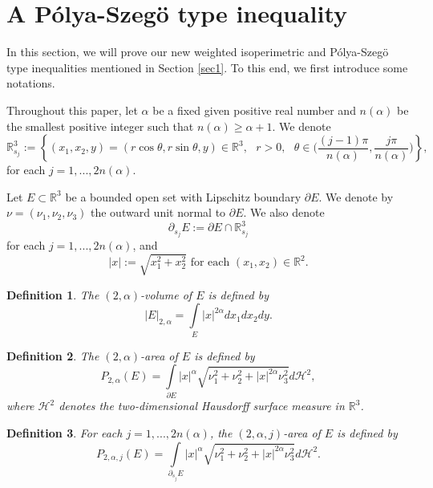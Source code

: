 \documentclass[10pt, reqno]{amsart}
\newtheorem{definition}{Definition}
\begin{document}
	\section{A P\'olya-Szeg\"o type inequality}\label{sec2}
	In this section, we will prove our new weighted isoperimetric and P\'olya-Szeg\"o type inequalities mentioned in Section \ref{sec1}. To this end, we first introduce some notations.
	
	Throughout this paper, let $\alpha$ be a fixed given positive real number and $n(\alpha)$ be the smallest positive integer such that $n(\alpha) \geq \alpha+1$. We denote 
	$$\mathbb{R}^3_{s_j} := \left\{(x_1,x_2,y) = (r\cos\theta, r\sin\theta, y) \in \mathbb{R}^3, \textrm{ } r >0, \textrm{ } \theta \in \Big(\frac{(j-1)\pi}{n(\alpha)},\frac{j\pi}{n(\alpha)}\Big)\right\},$$
	for each $j=1,...,2n(\alpha)$. 
	
	Let $E \subset \mathbb{R}^3$ be a bounded open set with Lipschitz boundary $\partial E$. We denote by $\nu = (\nu_1, \nu_2, \nu_3)$ the outward unit normal to $\partial E$.  We also denote
	$$ \partial_{s_j} E:= \partial E \cap \mathbb{R}^3_{s_j}$$
	for each $j=1,...,2n(\alpha)$, and 
	$$ |x| := \sqrt{x_1^2 + x_2^2} \textrm{ for each } (x_1,x_2) \in \mathbb{R}^2.$$
	
	\begin{definition}\label{def1}
		The $(2,\alpha)$-volume of $E$ is defined by
		$$ |E|_{2,\alpha} = \int\limits_E |x|^{2\alpha} dx_1dx_2 dy.$$ 
	\end{definition}
	
	\begin{definition}\label{def2}
		The $(2,\alpha)$-area of $E$ is defined by
		$$ P_{2,\alpha} (E) = \int\limits_{\partial E} |x|^\alpha \sqrt{ \nu_1^2 + \nu_2^2 + |x|^{2\alpha} \nu_3^2}d\mathcal{H}^2,$$ 
		where $\mathcal{H}^2$ denotes the two-dimensional Hausdorff surface measure in $\mathbb{R}^3$.
	\end{definition}
	
	\begin{definition}\label{def3}
		For each $j=1,...,2n(\alpha)$, the $(2,\alpha,j)$-area of $E$ is defined by
		$$ P_{2,\alpha,j} (E) = \int\limits_{\partial_{s_j} E} |x|^\alpha \sqrt{ \nu_1^2 + \nu_2^2 + |x|^{2\alpha} \nu_3^2}d\mathcal{H}^2.$$ 
	\end{definition}
	
\end{document}
